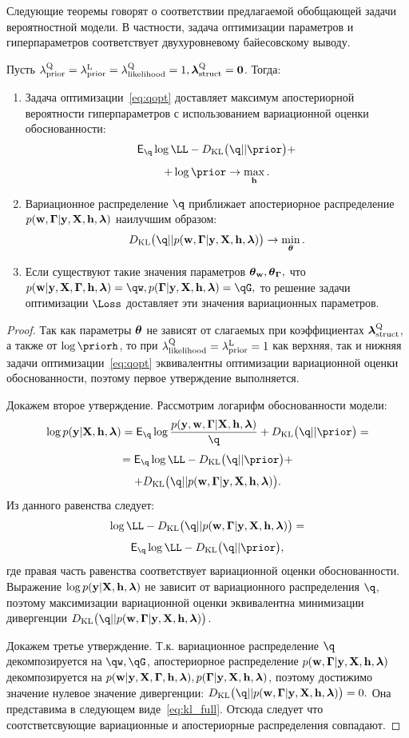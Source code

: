Следующие теоремы говорят о соответствии предлагаемой обобщающей задачи вероятностной модели. В частности, задача оптимизации параметров и гиперпараметров соответствует двухуровневому байесовскому выводу.
\begin{theorem}
Пусть ${\lambda_\text{prior}^\text{Q}} = \lambda_\text{prior}^\text{L}=\lambda_\text{likelihood}^\text{Q} = 1, \boldsymbol{\lambda}_\text{struct}^\text{Q}=\mathbf{0}$. Тогда:
\begin{enumerate}
\item Задача оптимизации~\eqref{eq:qopt} доставляет максимум апостериорной вероятности гиперпараметров с использованием вариационной оценки обоснованности:
\vspace{-0.3cm}
\[
    \E_{\q}\log \LL - \KL{\q}{\prior} +
\]
\[
+ \log \prior \to \max_{\h}.
\]
\item Вариационное распределение $\q$ приближает апостериорное распределение $p(\mathbf{w}, \boldsymbol{\Gamma}|\mathbf{y}, \mathbf{X}, \mathbf{h},\boldsymbol{\lambda})$ наилучшим образом:
\vspace{-0.3cm}
\[
    \KL{\q}{\post} \to \min_{\teta}.
\]


\item Если существуют такие значения параметров $\boldsymbol{\theta}_\mathbf{w}, \boldsymbol{\theta}_{\boldsymbol{\Gamma}},$ что $\postw = \qw, \postG = \qG,$
то решение задачи оптимизации $\Loss$ доставляет эти значения вариационных параметров.  
\end{enumerate}
\end{theorem}
\begin{proof}
Так как параметры $\boldsymbol{\theta}$ не зависят от слагаемых при коэффициентах $\boldsymbol{\lambda}_\text{struct}^\text{Q}$, а также от $\log \priorh$, то 
при $\lambda_\text{likelihood}^\text{Q} = \lambda_\text{prior}^\text{L} = 1$ как верхняя, так и нижняя задачи оптимизации~\eqref{eq:qopt} эквивалентны оптимизации вариационной оценки обоснованности, поэтому первое утверждение выполняется.

Докажем второе утверждение. Рассмотрим логарифм обоснованности модели: 
\[
\log \EV  = \E_{\q} \log\frac{p(\y, \w, \G|\X, \h, \lam)}{\q} + \KL{\q}{\prior} = 
 \]
\[
=\E_{\q} \log \LL - \KL{\q}{\prior}+
\]
\[
 + \KL{\q}{\post}.
\]
Из данного равенства следует:
\[
\log \LL - \KL{\q}{\post} = 
\]
\[
\E_{\q}\log \LL - \KL{\q}{\prior},
\]
где правая часть равенства соответствует вариационной оценки обоснованности. Выражение $\log p(\mathbf{y}|\mathbf{X}, \mathbf{h},\boldsymbol{\lambda})$ не зависит от вариационного распределения  $\q$, поэтому максимизации вариационной оценки эквивалентна минимизации дивергенции $\KL{\q}{\post}$.

Докажем третье утверждение. Т.к. вариационное распределение $\q$ декомпозируется на $\qw, \qG$, апостериорное распределение $p(\mathbf{w}, \boldsymbol{\Gamma}|\mathbf{y}, \mathbf{X}, \mathbf{h},\boldsymbol{\lambda})$ декомпозируется на $p(\mathbf{w}|\mathbf{y}, \mathbf{X}, \boldsymbol{\Gamma}, \mathbf{h},\boldsymbol{\lambda}), p(\boldsymbol{\Gamma}|\mathbf{y}, \mathbf{X}, \mathbf{h},\boldsymbol{\lambda})$, поэтому достижимо значение нулевое значение
дивергенции: $\KL{\q}{\post} = 0.$ Она представима в следующем виде~\eqref{eq:kl_full}.
Отсюда следует что соотстветсвующие вариационные и апостериорные распределения совпадают.
\end{proof}


